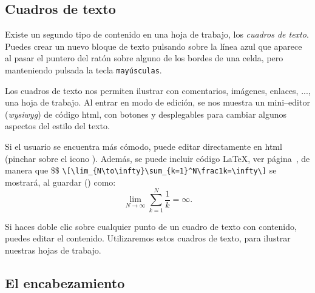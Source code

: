 \subsection*{Cuadros de texto}

Existe un segundo tipo de contenido en una hoja de trabajo, los \emph{cuadros de
texto}. Puedes crear un nuevo bloque de texto
pulsando sobre la línea azul que aparece al pasar el puntero del ratón sobre
alguno de los bordes de una celda, pero manteniendo pulsada la tecla 
\verb|mayúsculas|.



Los cuadros de texto nos permiten ilustrar con comentarios, imágenes, enlaces,
..., una hoja de trabajo. Al entrar en modo de edición, se nos muestra un
mini--editor ({\itshape wysiwyg})
de código html, con botones y desplegables para cambiar algunos aspectos del
estilo del texto. 


Si el usuario se encuentra más cómodo, puede editar directamente en html
(pinchar sobre el icono ). Además, se puede incluir código \LaTeX,
ver
p\'agina~\pageref{latex}, 
de manera que \$\$%
\lstinline[language={[LaTeX]TeX}]|\[\lim_{N\to\infty}\sum_{k=1}^N\frac1k=\infty\]| %
se mostrará, al guardar () como:
\[\lim_{N\to\infty}\sum_{k=1}^N\frac1k=\infty.\]


Si haces doble clic sobre cualquier punto de un cuadro de texto con contenido,
puedes editar el contenido. Utilizaremos estos cuadros de texto, para ilustrar
nuestras hojas de trabajo. 


\subsection*{El encabezamiento}

